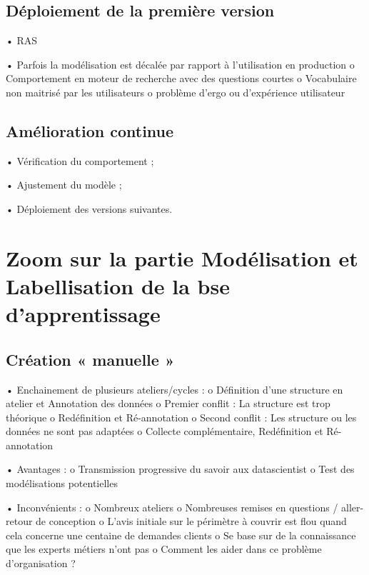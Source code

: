         \subsection{Déploiement de la première version}

            •	RAS

            •	Parfois la modélisation est décalée par rapport à l'utilisation en production
                o	Comportement en moteur de recherche avec des questions courtes
                o	Vocabulaire non maitrisé par les utilisateurs
                o	problème d'ergo ou d'expérience utilisateur

        \subsection{Amélioration continue}

            •	Vérification du comportement ;

            •	Ajustement du modèle ;

            •	Déploiement des versions suivantes.

    \section{Zoom sur la partie Modélisation et Labellisation de la bse d'apprentissage}

        \subsection{Création « manuelle »}

            •	Enchainement de plusieurs ateliers/cycles :
                o	Définition d’une structure en atelier et Annotation des données
                o	Premier conflit : La structure est trop théorique
                o	Redéfinition et Ré-annotation
                o	Second conflit : Les structure ou les données ne sont pas adaptées
                o	Collecte complémentaire, Redéfinition et Ré-annotation

            •	Avantages :
                o	Transmission progressive du savoir aux datascientist
                o	Test des modélisations potentielles

            •	Inconvénients :
                o	Nombreux ateliers
                o	Nombreuses remises en questions / aller-retour de conception
                o	L'avis initiale sur le périmètre à couvrir est flou quand cela concerne une centaine de demandes clients
                o	Se base sur de la connaissance que les experts métiers n’ont pas
                o	Comment les aider dans ce problème d’organisation ?

